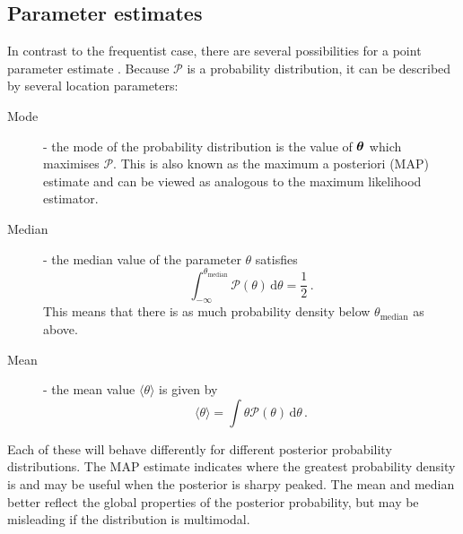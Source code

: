 \subsection{Parameter estimates}

In contrast to the frequentist case, there are several possibilities for a point parameter estimate . Because $\mathcal{P}$ is a probability distribution, it can be described by several location parameters:

\begin{description}
\item[Mode] - the mode of the probability distribution is the value of $\boldsymbol\theta$ which maximises $\mathcal{P}$. This is also known as the maximum a posteriori (MAP) estimate and can be viewed as analogous to the maximum likelihood estimator.
\item[Median] - the median value of the parameter $\theta$ satisfies
\begin{equation}
\int_{-\infty}^{\theta_\textrm{median}} \mathcal{P}(\theta) \, \mathrm{d}\theta = \frac{1}{2}\,.
\end{equation}
This means that there is as much probability density below $\theta_\textrm{median}$ as above.
\item[Mean] - the mean value $\langle \theta \rangle$ is given by 
\begin{equation}
\langle \theta \rangle = \int \theta \mathcal{P}(\theta) \, \mathrm{d}\theta\,.
\end{equation}
\end{description}
Each of these will behave differently for different posterior probability distributions. The MAP estimate indicates where the greatest probability density is and may be useful when the posterior is sharpy peaked. The mean and median better reflect the global properties of the posterior probability, but may be misleading if the distribution is multimodal. 


